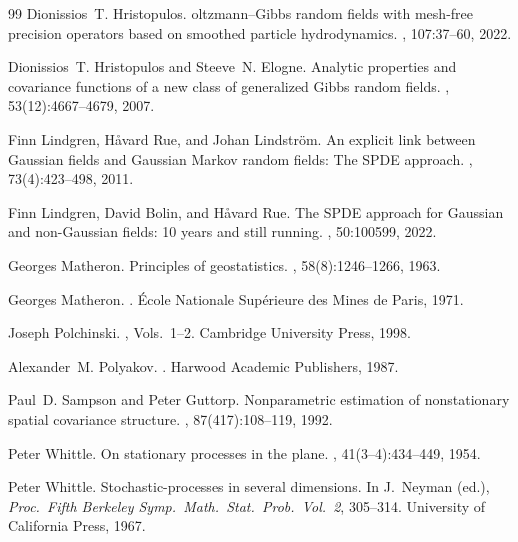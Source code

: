 \documentclass[11pt]{article}
\theoremstyle{definition}
\theoremstyle{plain}
\theoremstyle{remark}
\begin{document}
\begin{thebibliography}{99}
Dionissios~T. Hristopulos.
oltzmann--{G}ibbs random fields with mesh-free precision operators based on smoothed particle hydrodynamics.
, 107:37--60, 2022.

Dionissios~T. Hristopulos and Steeve~N. Elogne.
\newblock Analytic properties and covariance functions of a new class of generalized {G}ibbs random fields.
, 53(12):4667--4679, 2007.

Finn Lindgren, H{\aa}vard Rue, and Johan Lindstr{\"o}m.
\newblock An explicit link between {G}aussian fields and {G}aussian {M}arkov random fields: The {SPDE} approach.
, 73(4):423--498, 2011.

Finn Lindgren, David Bolin, and H{\aa}vard Rue.
\newblock The {SPDE} approach for {G}aussian and non-{G}aussian fields: 10 years and still running.
, 50:100599, 2022.

Georges Matheron.
\newblock Principles of geostatistics.
, 58(8):1246--1266, 1963.

Georges Matheron.
.
\newblock \'Ecole Nationale Sup\'erieure des Mines de Paris, 1971.

Joseph Polchinski.
, Vols.\ 1--2.
\newblock Cambridge University Press, 1998.

Alexander~M. Polyakov.
.
\newblock Harwood Academic Publishers, 1987.

Paul~D. Sampson and Peter Guttorp.
\newblock Nonparametric estimation of nonstationary spatial covariance structure.
, 87(417):108--119, 1992.

Peter Whittle.
\newblock On stationary processes in the plane.
, 41(3--4):434--449, 1954.

Peter Whittle.
\newblock Stochastic-processes in several dimensions.
\newblock In J.\ Neyman (ed.), {\em Proc.\ Fifth Berkeley Symp.\ Math.\ Stat.\ Prob.\ Vol.\ 2}, 305--314.
\newblock University of California Press, 1967.

\end{thebibliography}
\end{document}
